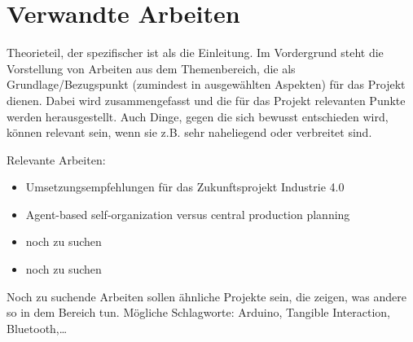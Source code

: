 \chapter{Verwandte Arbeiten}

Theorieteil, der spezifischer ist als die Einleitung. Im Vordergrund steht die Vorstellung von Arbeiten aus dem Themenbereich, die als Grundlage/Bezugspunkt (zumindest in ausgewählten Aspekten) für das Projekt dienen. Dabei wird zusammengefasst und die für das Projekt relevanten Punkte werden herausgestellt. Auch Dinge, gegen die sich bewusst entschieden wird, können relevant sein, wenn sie z.B. sehr naheliegend oder verbreitet sind.

Relevante Arbeiten:
\begin{itemize}
\item Umsetzungsempfehlungen für das Zukunftsprojekt Industrie 4.0 \parencite{arbeitsbericht}
\item Agent-based self-organization versus central production planning \autocite{agents}
\item noch zu suchen
\item noch zu suchen
\end{itemize}

Noch zu suchende Arbeiten sollen ähnliche Projekte sein, die zeigen, was andere so in dem Bereich tun. Mögliche Schlagworte: Arduino, Tangible Interaction, Bluetooth,\dots{}